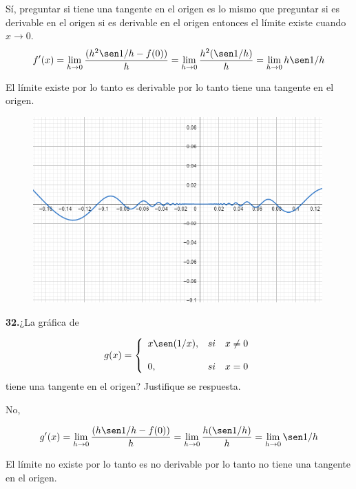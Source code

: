 \documentclass[12pt, letterpaper]{article}
\begin{document}
Sí, preguntar si tiene una tangente en el origen es lo mismo que preguntar si es derivable en el origen si es derivable en el origen entonces el límite existe cuando $x \to 0$.\\

$$f'(x) =\lim_{ h \to 0} \frac{( h^2 \sen 1/h - f(0))}{h} = \lim_{ h \to 0} \frac{h^2 (\sen 1/h)}{h} = \lim_{ h \to 0} h \sen 1/h $$

El límite existe por lo tanto es derivable por lo tanto tiene una tangente en el origen.

\begin{figure}[tbh]
\centering
\includegraphics[width=30em]{t14dos}
\end{figure}
\newpage

\textbf{32.}¿La gráfica de

\begin{align*}
g(x)= \left\{ \begin{array}{lcc}
                 x \sen (1/x), &   si   & x \neq 0 \\
             	\\ 0, &   si   & x = 0
             \end{array}
   \right.
\end{align*}
tiene una tangente en el origen? Justifique se respuesta.

No,

$$g'(x) =\lim_{ h \to 0} \frac{( h \sen 1/h - f(0))}{h} = \lim_{ h \to 0} \frac{h (\sen 1/h)}{h} = \lim_{ h \to 0}  \sen 1/h $$

El límite no existe por lo tanto es no derivable por lo tanto no tiene una tangente en el origen.
\end{document}
